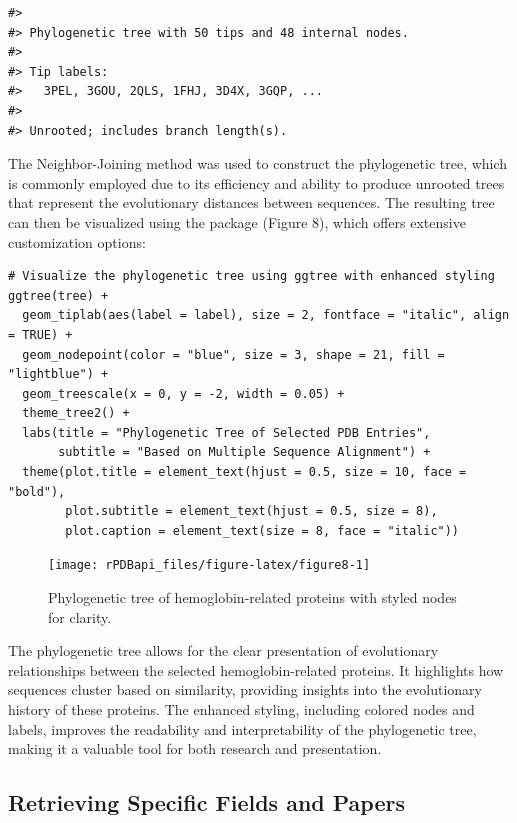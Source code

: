 \begin{verbatim}
#> 
#> Phylogenetic tree with 50 tips and 48 internal nodes.
#> 
#> Tip labels:
#>   3PEL, 3GOU, 2QLS, 1FHJ, 3D4X, 3GQP, ...
#> 
#> Unrooted; includes branch length(s).
\end{verbatim}

The Neighbor-Joining method \citep{saitou1987neighbor} was used to construct the phylogenetic tree, which is commonly employed due to its efficiency and ability to produce unrooted trees that represent the evolutionary distances between sequences. The resulting tree can then be visualized using the  package (Figure 8), which offers extensive customization options:

\begin{verbatim}
# Visualize the phylogenetic tree using ggtree with enhanced styling
ggtree(tree) +
  geom_tiplab(aes(label = label), size = 2, fontface = "italic", align = TRUE) +
  geom_nodepoint(color = "blue", size = 3, shape = 21, fill = "lightblue") +
  geom_treescale(x = 0, y = -2, width = 0.05) +
  theme_tree2() +
  labs(title = "Phylogenetic Tree of Selected PDB Entries",
       subtitle = "Based on Multiple Sequence Alignment") +
  theme(plot.title = element_text(hjust = 0.5, size = 10, face = "bold"),
        plot.subtitle = element_text(hjust = 0.5, size = 8),
        plot.caption = element_text(size = 8, face = "italic"))
\end{verbatim}

\begin{figure}[H]
\texttt{[image: rPDBapi\_files/figure-latex/figure8-1]} \caption{Phylogenetic tree of hemoglobin-related proteins with styled nodes for clarity.}\label{fig:figure8}
\end{figure}

The phylogenetic tree allows for the clear presentation of evolutionary relationships between the selected hemoglobin-related proteins. It highlights how sequences cluster based on similarity, providing insights into the evolutionary history of these proteins. The enhanced styling, including colored nodes and labels, improves the readability and interpretability of the phylogenetic tree, making it a valuable tool for both research and presentation.

\subsection{Retrieving Specific Fields and Papers}\label{retrieving-specific-fields-and-papers}

